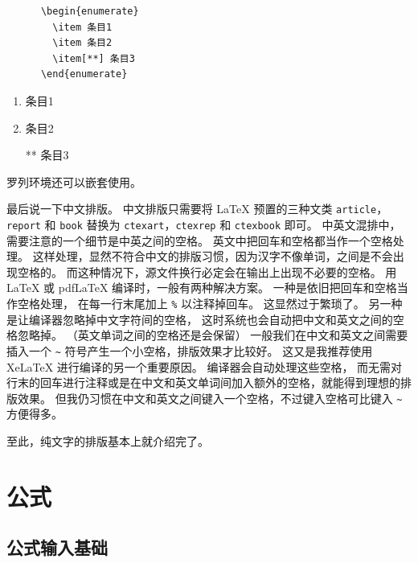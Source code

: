 \vspace{1.2em}
\begin{minipage}{0.5\textwidth}
\small
\begin{verbatim}
      \begin{enumerate}
        \item 条目1
        \item 条目2
        \item[**] 条目3
      \end{enumerate}
\end{verbatim}
\end{minipage}\qquad\begin{minipage}{0.3\textwidth}
\begin{enumerate}
  \item 条目1
  \item 条目2
  \item[**] 条目3
\end{enumerate}
\end{minipage}

\vspace{1.2em}\noindent
罗列环境还可以嵌套使用。

最后说一下中文排版。
中文排版只需要将 \LaTeX{} 预置的三种文类
\texttt{article}，\texttt{report} 和 \texttt{book}
替换为 \texttt{ctexart}，\texttt{ctexrep} 和 \texttt{ctexbook} 即可。
中英文混排中，需要注意的一个细节是中英之间的空格。
英文中把回车和空格都当作一个空格处理。
这样处理，显然不符合中文的排版习惯，因为汉字不像单词，之间是不会出现空格的。
而这种情况下，源文件换行必定会在输出上出现不必要的空格。
用 LaTeX 或 pdfLaTeX 编译时，一般有两种解决方案。
一种是依旧把回车和空格当作空格处理，
在每一行末尾加上 \verb|%| 以注释掉回车。
这显然过于繁琐了。
另一种是让编译器忽略掉中文字符间的空格，
这时系统也会自动把中文和英文之间的空格忽略掉。
（英文单词之间的空格还是会保留）
一般我们在中文和英文之间需要插入一个 \verb|~| 符号产生一个小空格，排版效果才比较好。
这又是我推荐使用 XeLaTeX 进行编译的另一个重要原因。
编译器会自动处理这些空格，
而无需对行末的回车进行注释或是在中文和英文单词间加入额外的空格，就能得到理想的排版效果。
但我仍习惯在中文和英文之间键入一个空格，不过键入空格可比键入 \verb|~| 方便得多。

至此，纯文字的排版基本上就介绍完了。


\section{公式}

\subsection{公式输入基础}

